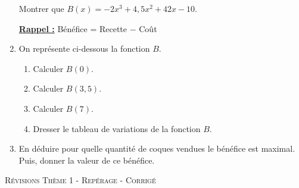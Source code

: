 \documentclass[a4paper]{article}
\begin{document}
\begin{exercice}{}{}
\begin{enumerate}
        Montrer que $B(x) = -2x^3 + 4,5x^2 + 42x - 10$.

        \underline{\bf Rappel :} Bénéfice = Recette $-$ Coût


        \item On représente ci-dessous la fonction $B$.
      \vspace{2mm}
      
     
      \begin{center}
    \end{center}

      \begin{enumerate}
        \item Calculer $B(0)$.
        \item Calculer $B(3,5)$.
        \item Calculer $B(7)$.
        \item Dresser le tableau de variations de la fonction $B$.
      \end{enumerate}
      \item En déduire pour quelle quantité de coques vendues le bénéfice est maximal. Puis, donner la valeur de ce bénéfice.

      \end{enumerate}
            

    \end{exercice}
  \pagebreak
  
  
  
\begin{center}
    {\scshape\LARGE Révisions Thème 1 - Repérage - Corrigé\par}
    \vspace{0.5cm}
  \end{center}

  \setcounter{exercice}{0}
\end{document}
